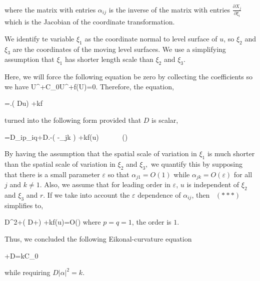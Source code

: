 \documentclass[]{article}
\numberwithin{equation}{section}		%
\let\[\equation
\let\]\endequation
\begin{document}
\noindent where the matrix with entries $\alpha _{ij}$ is the inverse of the matrix
with entries $\frac{\partial X_{j}}{\partial \xi _{i}}$ which is the
Jacobian of the coordinate transformation.

We identify te variable $\xi _{1}$ as the coordinate normal to level surface
of $u$, so $\xi _{2}$ and $\xi _{3}$ are the coordinates of the moving level
surfaces. We use a simplifying assumption that $\xi _{1}$ has shorter length
scale than  $\xi _{2}$ and $\xi _{3}.$

Here, we will force the following equation be zero by collecting the
coefficients so we have 
\[
U^{\cdot \cdot }+C_{0}U^{\cdot }+f(U)=0.
\]
\indent Therefore, the equation,

\[
=\triangledown .\left( D\triangledown u\right)
+kf \ \ \
\]

\noindent turned into the following form provided that $D$ is scalar,

\[
0=D\alpha _{ip}\alpha _{iq}\frac{\partial ^{2}u}{\partial \xi _{p}\partial
\xi _{q}}+D\frac{\partial \alpha _{ip}}{\partial x_{i}}.\frac{\partial u}{%
\partial \xi _{p}}-\left( \frac{\partial u}{\partial \tau }-\frac{\partial
X_{J}}{\partial \tau }\alpha _{jk}\frac{\partial u}{\partial \xi _{k}}%
\right) +kf(u) \ \ \ \ \ \ (\ast \ast \ast )
\]

By having the assumption that the spatial scale of variation in $\xi _{1}$
is much shorter than the spatial scale of variation in  $\xi _{2}$ and $\xi
_{3},$ we quantify this by supposing that there is a small parameter $%
\varepsilon $ so that $\alpha _{j1}=O(1)$ while $\alpha _{jk}=O(\varepsilon )
$ for all $j$ and $k\neq 1.$ Also, we assume that for leading order in $%
\varepsilon $, $u$ is independent of $\xi _{2}$ and $\xi _{3}$ and $r.$ If
we take into account the $\varepsilon $ dependence of $\alpha _{ij}$, then \
$(\ast \ast \ast )$ simplifies to,

\[
D\left\vert \alpha \right\vert ^{2}+\left( D\triangledown \cdot \alpha +\frac{\partial x}{\partial
\tau }\cdot \alpha \right) \frac{\partial u}{\partial \xi _{1}}%
+kf(u)=O(\varepsilon )
\]
where $p=q=1$, the order is $1.$

Thus, we concluded the following Eikonal-curvature equation

\[
\cdot \alpha
+D\triangledown \cdot \alpha =kC_{0}
\]

\noindent while requiring $D\left\vert \alpha \right\vert ^{2}=k.$
\end{document}
